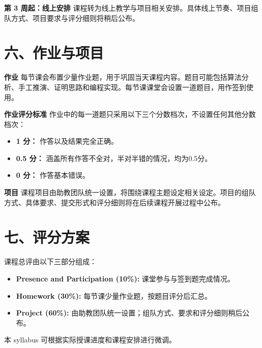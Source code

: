 \documentclass[11pt,a4paper,fontset=none]{ctexart}
\newcommand{\keypoint}[1]{\textbf{\textcolor{emphred}{#1}}}
\begin{document}
\keypoint{第 3 周起：线上安排} 课程转为线上教学与项目相关安排。具体线上节奏、项目组队方式、项目要求与评分细则将稍后公布。

\section*{六、作业与项目}

\keypoint{作业} 每节课会布置少量作业题，用于巩固当天课程内容。题目可能包括算法分析、手工推演、证明思路和编程实现。每节课课堂会设置一道题目，用作签到使用。

\keypoint{作业评分标准} 作业中的每一道题只采用以下三个分数档次，不设置任何其他分数档次：

\begin{itemize}
  \item \keypoint{1 分：} 作答以及结果完全正确。
  \item \keypoint{0.5 分：} 涵盖所有作答不全对，半对半错的情况，均为0.5分。
  \item \keypoint{0 分：} 作答基本错误。
\end{itemize}

\keypoint{项目} 课程项目由助教团队统一设置，将围绕课程主题设定相关设定。项目的组队方式、具体要求、提交形式和评分细则将在后续课程开展过程中公布。

\section*{七、评分方案}

课程总评由以下三部分组成：

\begin{itemize}
  \item \keypoint{Presence and Participation (10\%):} 课堂参与与签到题完成情况。
  \item \keypoint{Homework (30\%):} 每节课少量作业题，按题目评分后汇总。
  \item \keypoint{Project (60\%):} 由助教团队统一设置；组队方式、要求和评分细则稍后公布。
\end{itemize}

\vfill

\begin{center}
{\small 本 syllabus 可根据实际授课进度和课程安排进行微调。}
\end{center}
\end{document}
